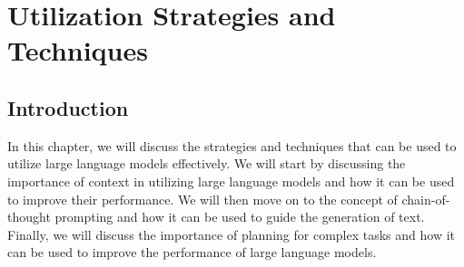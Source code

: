 
\chapter{Utilization Strategies and Techniques}
\label{ch:utilization}

\section{Introduction}
\label{sec:ch4-introduction}

In this chapter, we will discuss the strategies and techniques that can be used to utilize large language models effectively.
We will start by discussing the importance of context in utilizing large language models and how it can be used to improve their performance.
We will then move on to the concept of chain-of-thought prompting and how it can be used to guide the generation of text.
Finally, we will discuss the importance of planning for complex tasks and how it can be used to improve the performance of large language models.

